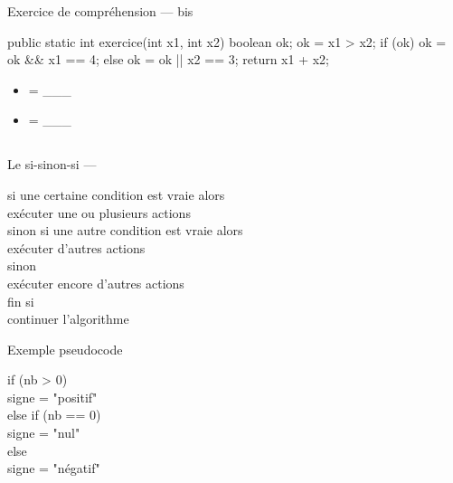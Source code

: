 \begin{hideedit}
\begin{frame}[fragile]{Exercice de compréhension --- bis}
  \begin{java}
public static int exercice(int x1, int x2) {
    boolean ok;
    ok = x1 > x2;
    if (ok) {
        ok = ok && x1 == 4;
    } else {
        ok = ok || x2 == 3;
    }
    return x1 + x2;
}
    \end{java}

    \medskip
    \begin{multicols}{2}
    \begin{itemize}
    \item {} = \_\_\_
    \item {} = \_\_\_
    \end{itemize}
    \end{multicols}
\end{frame}

\subsection{}
\begin{frame}{Le si-sinon-si --- }
  \begin{langagenaturel}
    si une certaine condition est vraie alors\\
      \tab exécuter une ou plusieurs actions\\
    sinon si une autre condition est vraie alors\\
      \tab exécuter d'autres actions\\
    sinon \\
      \tab exécuter encore d'autres actions\\
    fin si\\
    continuer l'algorithme
  \end{langagenaturel}
\end{frame}

\begin{frame}{Exemple pseudocode}
  \begin{langagenaturel}
    if (nb > 0)\\
      \tab signe = "positif"\\
    else if (nb ==  0)\\
      \tab signe = "nul"\\
    else\\
      \tab signe = "négatif"
  \end{langagenaturel}
\end{frame}


\end{hideedit}
